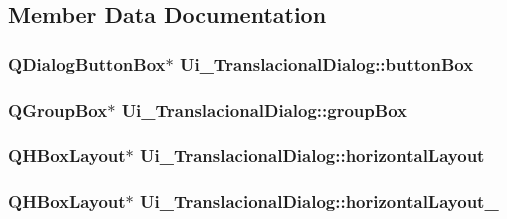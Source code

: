 \subsection{Member Data Documentation}
\hypertarget{class_ui___translacional_dialog_a33199e9bf824102f6300a1ceb4354aca}{
\subsubsection[{button\-Box}]{\setlength{\rightskip}{0pt plus 5cm}Q\-Dialog\-Button\-Box$\ast$ Ui\-\_\-\-Translacional\-Dialog\-::button\-Box}}\label{class_ui___translacional_dialog_a33199e9bf824102f6300a1ceb4354aca}
\hypertarget{class_ui___translacional_dialog_a2890847b40cd28ad2d27cd90ba2b3afd}{
\subsubsection[{group\-Box}]{\setlength{\rightskip}{0pt plus 5cm}Q\-Group\-Box$\ast$ Ui\-\_\-\-Translacional\-Dialog\-::group\-Box}}\label{class_ui___translacional_dialog_a2890847b40cd28ad2d27cd90ba2b3afd}
\hypertarget{class_ui___translacional_dialog_a4a836c9f9e02a433288eff09f3138d3b}{
\subsubsection[{horizontal\-Layout}]{\setlength{\rightskip}{0pt plus 5cm}Q\-H\-Box\-Layout$\ast$ Ui\-\_\-\-Translacional\-Dialog\-::horizontal\-Layout}}\label{class_ui___translacional_dialog_a4a836c9f9e02a433288eff09f3138d3b}
\hypertarget{class_ui___translacional_dialog_a66f99a13414c872e8980c067129b3c58}{
\subsubsection[{horizontal\-Layout\-\_\-2}]{\setlength{\rightskip}{0pt plus 5cm}Q\-H\-Box\-Layout$\ast$ Ui\-\_\-\-Translacional\-Dialog\-::horizontal\-Layout\-\_}}\label{class_ui___translacional_dialog_a66f99a13414c872e8980c067129b3c58}
